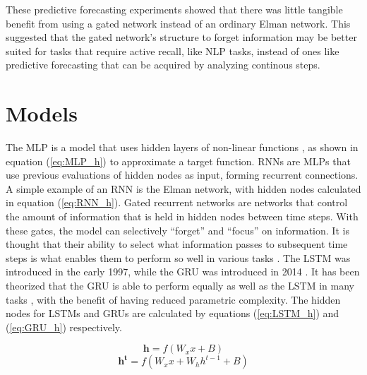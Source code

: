 \documentclass[11pt]{article}
\begin{document}
These predictive forecasting experiments showed that there was
little tangible benefit from using a gated network instead of an
ordinary Elman network. This suggested that
the gated network's structure to forget information may be
better suited for tasks that require active recall, like NLP tasks, instead of ones like
predictive forecasting that can be acquired by analyzing continous steps.

\section{Models}
The MLP is a model that uses hidden layers of non-linear functions
, as shown in equation (\ref{eq:MLP_h})
to approximate a target function. RNNs are MLPs that use previous evaluations
of hidden nodes as input, forming recurrent connections. A simple example of an RNN is the Elman network, with hidden nodes calculated in
equation (\ref{eq:RNN_h}).
Gated recurrent networks are networks that control the
amount of information that is held in hidden nodes between time
steps. With these gates, the model can selectively ``forget''
and ``focus'' on information. It is thought that their ability to select what information
passes to subsequent time steps is what enables them to perform so
well in various tasks \cite{LSTM}. The LSTM was introduced in the early
1997, while the GRU was introduced in 2014 \cite{GRU}. It has been theorized
that the GRU is able to perform equally as well as the LSTM in many tasks \cite{Chung}, with the benefit of having reduced parametric complexity. 
The hidden nodes for
LSTMs and GRUs are calculated by equations (\ref{eq:LSTM_h}) and (\ref{eq:GRU_h})
respectively.

\begin{equation}
\mathbf{h} = f( W_xx+B)
\label{eq:MLP_h}
\end{equation}
\begin{equation}
\mathbf{h^t} = f(W_xx+W_hh^{t-1}+B)
\label{eq:RNN_h}
\end{equation}
\end{document}
